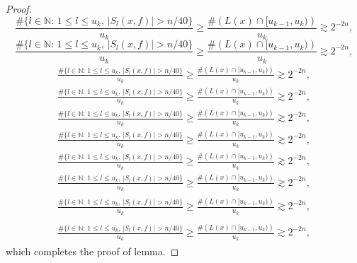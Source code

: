 \documentclass{amsart}
\numberwithin{equation}{section}
\begin{document}
\begin{proof}
{
\begin{equation*} 
\frac{\#\{l\in {\ensuremath{\mathbb N}}:\,1\le l\le u_k,\, |S_l(x,f)|>n/40 \}}{u_k}\ge \frac{\#\left(L(x)\cap [u_{k-1},u_k)\right)}{u_k}\gtrsim 2^{-2n},
 \end{equation*}\fi  
{}\begin{equation}
\frac{\#\{l\in {\ensuremath{\mathbb N}}:\,1\le l\le u_k,\, |S_l(x,f)|>n/40 \}}{u_k}\ge \frac{\#\left(L(x)\cap [u_{k-1},u_k)\right)}{u_k}\gtrsim 2^{-2n},
\end{equation}\fi   
{}\begin{align*}
\frac{\#\{l\in {\ensuremath{\mathbb N}}:\,1\le l\le u_k,\, |S_l(x,f)|>n/40 \}}{u_k}\ge \frac{\#\left(L(x)\cap [u_{k-1},u_k)\right)}{u_k}\gtrsim 2^{-2n},
\end{align*}\fi   
{}\begin{align}
\frac{\#\{l\in {\ensuremath{\mathbb N}}:\,1\le l\le u_k,\, |S_l(x,f)|>n/40 \}}{u_k}\ge \frac{\#\left(L(x)\cap [u_{k-1},u_k)\right)}{u_k}\gtrsim 2^{-2n},
\end{align}\fi    
{}\begin{gather*}
\frac{\#\{l\in {\ensuremath{\mathbb N}}:\,1\le l\le u_k,\, |S_l(x,f)|>n/40 \}}{u_k}\ge \frac{\#\left(L(x)\cap [u_{k-1},u_k)\right)}{u_k}\gtrsim 2^{-2n},
\end{gather*}\fi  
{}\begin{gather}
\frac{\#\{l\in {\ensuremath{\mathbb N}}:\,1\le l\le u_k,\, |S_l(x,f)|>n/40 \}}{u_k}\ge \frac{\#\left(L(x)\cap [u_{k-1},u_k)\right)}{u_k}\gtrsim 2^{-2n},
\end{gather}\fi   
{}\begin{multline*}
\frac{\#\{l\in {\ensuremath{\mathbb N}}:\,1\le l\le u_k,\, |S_l(x,f)|>n/40 \}}{u_k}\ge \frac{\#\left(L(x)\cap [u_{k-1},u_k)\right)}{u_k}\gtrsim 2^{-2n},
\end{multline*}\fi  
{}\begin{multline}
\frac{\#\{l\in {\ensuremath{\mathbb N}}:\,1\le l\le u_k,\, |S_l(x,f)|>n/40 \}}{u_k}\ge \frac{\#\left(L(x)\cap [u_{k-1},u_k)\right)}{u_k}\gtrsim 2^{-2n},
\end{multline}\fi  
{}\begin{multline*}\begin{split}
\frac{\#\{l\in {\ensuremath{\mathbb N}}:\,1\le l\le u_k,\, |S_l(x,f)|>n/40 \}}{u_k}\ge \frac{\#\left(L(x)\cap [u_{k-1},u_k)\right)}{u_k}\gtrsim 2^{-2n},
\end{split}\end{multline*}\fi
{}\begin{multline}\begin{split}
\frac{\#\{l\in {\ensuremath{\mathbb N}}:\,1\le l\le u_k,\, |S_l(x,f)|>n/40 \}}{u_k}\ge \frac{\#\left(L(x)\cap [u_{k-1},u_k)\right)}{u_k}\gtrsim 2^{-2n},
\end{split}\end{multline}\fi
}
which completes the proof of lemma.
\end{proof}
\end{document}
